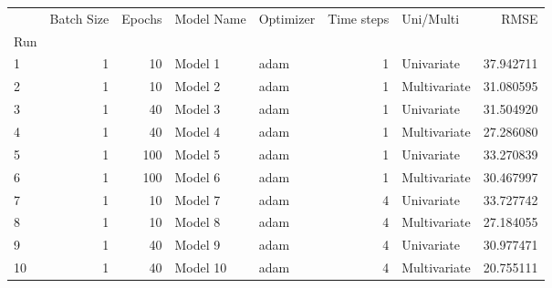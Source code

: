 \begin{tabular}{lrrllrlr}
\toprule
 & Batch Size & Epochs & Model Name & Optimizer & Time steps & Uni/Multi & RMSE \\
Run &  &  &  &  &  &  &  \\
\midrule
1 & 1 & 10 & Model 1 & adam & 1 & Univariate & 37.942711 \\
2 & 1 & 10 & Model 2 & adam & 1 & Multivariate & 31.080595 \\
3 & 1 & 40 & Model 3 & adam & 1 & Univariate & 31.504920 \\
4 & 1 & 40 & Model 4 & adam & 1 & Multivariate & 27.286080 \\
5 & 1 & 100 & Model 5 & adam & 1 & Univariate & 33.270839 \\
6 & 1 & 100 & Model 6 & adam & 1 & Multivariate & 30.467997 \\
7 & 1 & 10 & Model 7 & adam & 4 & Univariate & 33.727742 \\
8 & 1 & 10 & Model 8 & adam & 4 & Multivariate & 27.184055 \\
9 & 1 & 40 & Model 9 & adam & 4 & Univariate & 30.977471 \\
10 & 1 & 40 & Model 10 & adam & 4 & Multivariate & 20.755111 \\
\bottomrule
\end{tabular}

